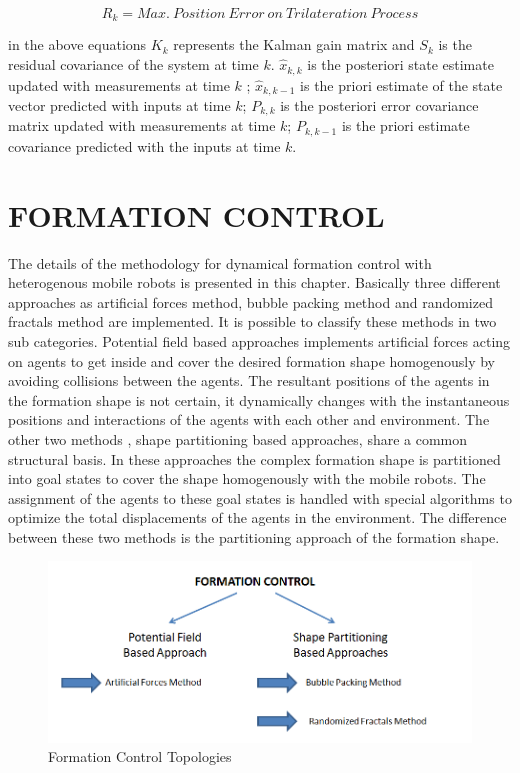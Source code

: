 \begin{equation}
R_k = Max.\ Position\ Error\ on\ Trilateration\ Process
\end{equation}
		
in the above equations $K_k$ represents the Kalman gain matrix and $S_k$ is the residual covariance of the system at time $k$. $\hat{x}_{k,k}$ is the posteriori state estimate updated with measurements at time $k$ ;  $\hat{x}_{k,k-1}$ is the priori estimate of the state vector predicted with inputs at time $k$; $P_{k,k}$ is the posteriori error covariance matrix updated with measurements at time $k$; $P_{k,k-1}$ is the priori estimate covariance predicted with the inputs at time $k$.
			
\section{FORMATION CONTROL}		
The details of the methodology for dynamical formation control with heterogenous mobile robots is presented in this chapter. Basically three different approaches as artificial forces method, bubble packing method and randomized fractals method are implemented. It is possible to classify these methods in two sub categories. Potential field based approaches implements artificial forces acting on agents to get inside and cover the desired formation shape homogenously by avoiding collisions between the agents. The resultant positions of the agents in the formation shape is not certain, it dynamically changes with the instantaneous positions and interactions of the agents with each other and environment. The other two methods , shape partitioning based approaches, share a common structural basis. In these approaches the complex formation shape is partitioned into goal states to cover the shape homogenously with the mobile robots. The assignment of the agents to these goal states is handled with special algorithms to optimize the total displacements of the agents in the environment. The difference between these two methods is the partitioning approach of the formation shape. 
		
\begin{figure}[H]
\caption{Formation Control Topologies}
\centering
\includegraphics[scale = 0.60]{methods}
\end{figure}		
		

